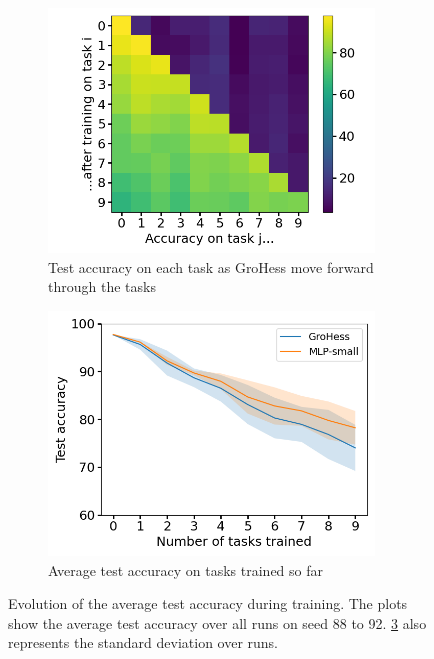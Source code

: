 \documentclass[11pt]{article}
\begin{document}
\begin{figure}
    \centering
    \begin{subfigure}[b]{0.35\textwidth}
        \centering
        \includegraphics[width=0.95\textwidth]{images/accs_matrix.png}
        \caption{Test accuracy on each task as GroHess move forward through the tasks}
        \label{fig:test_accs_matrix}
    \end{subfigure}
    \hspace{-0mm}
    \begin{subfigure}[b]{0.35\textwidth}
        \centering
        \includegraphics[width=0.95\textwidth]{images/agg_avg_acc_curve.png}
        \caption{Average test accuracy on tasks trained so far}
        \label{fig:classic_plot}
    \end{subfigure}
    \caption{Evolution of the average test accuracy during training. The plots show the average test accuracy over all runs on seed 88 to 92. \ref{fig:classic_plot} also represents the standard deviation over runs.}
\end{figure}
\end{document}
